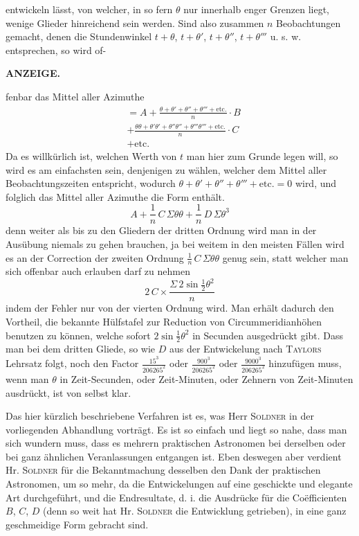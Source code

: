 entwickeln lässt, von welcher, in so fern $\theta$ nur innerhalb enger Grenzen liegt, wenige Glieder hinreichend sein werden. Sind also zusammen $n$ Beobachtungen gemacht, denen die Stundenwinkel $t+\theta$, $t+\theta'$, $t+\theta''$, $t+\theta'''$ u. s. w. entsprechen, so wird of-\par
\clearpage
\thispagestyle{empty}
\noindent{}%
%
\parbox[t]{\dimexpr\linewidth-24mm\relax}{\centering\footnotesize\bfseries ANZEIGE.\par}%
\makebox[12mm][r]{}\par\medskip
\noindent fenbar das Mittel aller Azimuthe
\[
\begin{aligned}&= A + \frac{\theta+\theta'+\theta''+\theta'''+\text{etc.}}{n}\cdot B\\[3pt]
&+ \frac{\theta\theta+\theta'\theta'+\theta''\theta''+\theta'''\theta'''+\text{etc.}}{n}\cdot C\\[3pt]
&+ \text{etc.}\end{aligned}
\]
Da es willkürlich ist, welchen Werth von $t$ man hier zum Grunde legen will, so wird es am einfachsten sein, denjenigen zu wählen, welcher dem Mittel aller Beobachtungszeiten entspricht, wodurch $\theta+\theta'+\theta''+\theta'''+\text{etc.}=0$ wird, und folglich das Mittel aller Azimuthe die Form enthält.
\[
A + \frac{1}{n}\,C\,\Sigma\theta\theta + \frac{1}{n}\,D\,\Sigma\theta^3
\]
denn weiter als bis zu den Gliedern der dritten Ordnung wird man in der Ausübung niemals zu gehen brauchen, ja bei weitem in den meisten Fällen wird es an der Correction der zweiten Ordnung $\frac{1}{n}\,C\,\Sigma\theta\theta$ genug sein, statt welcher man sich offenbar auch erlauben darf zu nehmen
\[
2\,C \times \frac{\Sigma\,2\sin\frac{1}{2}\theta^2}{n}
\]
indem der Fehler nur von der vierten Ordnung wird. Man erhält dadurch den Vortheil, die bekannte Hülfstafel zur Reduction von Circummeridianhöhen benutzen zu können, welche sofort $2\sin\frac{1}{2}\theta^2$ in Secunden ausgedrückt gibt. Dass man bei dem dritten Gliede, so wie $D$ aus der Entwickelung nach \textsc{Taylors} Lehrsatz folgt, noch den Factor $\frac{15^3}{206265^2}$ oder $\frac{900^3}{206265^2}$ oder $\frac{9000^3}{206265^2}$ hinzufügen muss, wenn man $\theta$ in Zeit-Secunden, oder Zeit-Minuten, oder Zehnern von Zeit-Minuten ausdrückt, ist von selbst klar.

Das hier kürzlich beschriebene Verfahren ist es, was Herr \textsc{Soldner} in der vorliegenden Abhandlung vorträgt. Es ist so einfach und liegt so nahe, dass man sich wundern muss, dass es mehrern praktischen Astronomen bei derselben oder bei ganz ähnlichen Veranlassungen entgangen ist. Eben deswegen aber verdient Hr. \textsc{Soldner} für die Bekanntmachung desselben den Dank der praktischen Astronomen, um so mehr, da die Entwickelungen auf eine geschickte und elegante Art durchgeführt, und die Endresultate, d. i. die Ausdrücke für die Coëfficienten $B$, $C$, $D$ (denn so weit hat Hr. \textsc{Soldner} die Entwicklung getrieben), in eine ganz geschmeidige Form gebracht sind.

